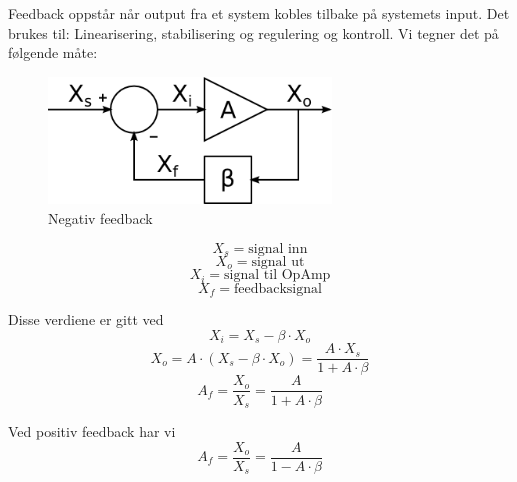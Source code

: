 Feedback oppstår når output fra et system kobles tilbake på systemets input.
Det brukes til: Linearisering, stabilisering og regulering og kontroll.
Vi tegner det på følgende måte:

\begin{figure}[H]
  \caption{Negativ feedback}
  \centering
  \includegraphics[width=0.67\textwidth]{./img/negfeedback}
\end{figure}

$$X_s = \text{signal inn}$$
$$X_o = \text{signal ut}$$
$$X_i = \text{signal til OpAmp}$$
$$X_f = \text{feedbacksignal}$$

Disse verdiene er gitt ved
$$X_i = X_s - \beta \cdot X_o$$
$$X_o = A \cdot (X_s - \beta \cdot X_o)
      = \frac{A \cdot X_s}{1 + A \cdot \beta}$$
$$A_f = \frac{X_o}{X_s} = \frac{A}{1 + A \cdot \beta}$$

Ved positiv feedback har vi
$$A_f = \frac{X_o}{X_s} = \frac{A}{1 - A \cdot \beta}$$
